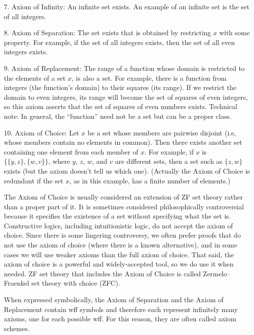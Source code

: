 7. Axiom of Infinity:  An infinite set exists.  An example of an infinite
   set is the set of all
   integers.

8. Axiom of Separation:  The set exists that is obtained by restricting $x$
   with some property.  For example, if the set of all integers exists,
   then the set of all even integers exists.

9. Axiom of Replacement:  The range of a function whose domain is restricted
   to the elements of a set $x$, is also a set.  For example, there
   is a function
   from integers (the function's domain) to their squares (its
   range).  If we
   restrict the domain to even integers, its range will become the set of
   squares of even integers, so this axiom asserts that the set of
    squares of even numbers exists.  Technical note:  In general, the
   ``function'' need not be a set but can be a proper class.

10. Axiom of Choice:  Let $x$ be a set whose members are pairwise
  disjoint (i.e,
  whose members contain no elements in common).  Then there exists another
  set containing one element from each member of $x$.  For
  example, if $x$ is
  $\{\{y,z\},\{w,v\}\}$, where $y$, $z$, $w$, and $v$ are
  different sets, then a set such as $\{z,w\}$
  exists (but the axiom doesn't tell
  us which one).  (Actually the Axiom
  of Choice is redundant if the set $x$, as in this example, has a finite
  number of elements.)

The Axiom of Choice is usually considered an extension of ZF set theory rather
than a proper part of it.  It is sometimes considered philosophically
controversial because it specifies the existence of a set without specifying
what the set is. Constructive logics, including intuitionistic logic,
do not accept the axiom of choice.
Since there is some lingering controversy, we often prefer proofs that do
not use the axiom of choice (where there is a known alternative), and
in some cases we will use weaker axioms than the full axiom of choice.
That said, the axiom of choice is a powerful and widely-accepted tool,
so we do use it when needed.
ZF set theory that includes the Axiom of Choice is
called Zermelo--Fraenkel set theory with choice (ZFC).

When expressed symbolically, the Axiom of Separation and the Axiom of
Replacement contain wff symbols and therefore each represent infinitely many
axioms, one for each possible wff. For this reason, they are often called
axiom schemes.

